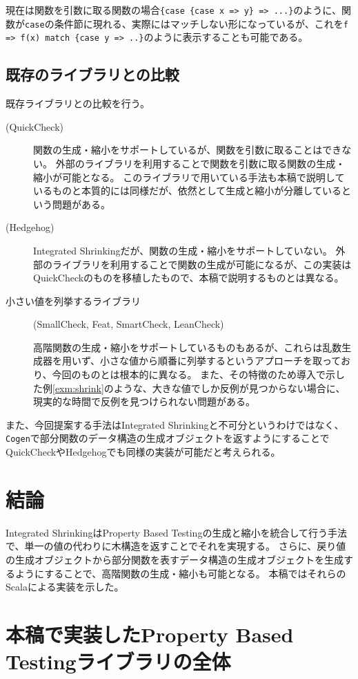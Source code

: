 \documentclass[submit,PRO]{ipsj}
\theoremstyle{definition}
\begin{document}
現在は関数を引数に取る関数の場合\texttt{\{case \{case x => y\} => ...\}}のように、関数が\texttt{case}の条件節に現れる、実際にはマッチしない形になっているが、これを\texttt{f => f(x) match \{case y => ..\}}のように表示することも可能である。

\subsection{既存のライブラリとの比較}

既存ライブラリとの比較を行う。

\begin{description}
  \item[(QuickCheck\cite{claessen_quickcheck_2011})]
    関数の生成・縮小をサポートしているが、関数を引数に取ることはできない。
    外部のライブラリ\cite{quickcheck-higherorder_online}を利用することで関数を引数に取る関数の生成・縮小が可能となる。
    このライブラリで用いている手法も本稿で説明しているものと本質的には同様だが、依然として生成と縮小が分離しているという問題がある。
  \item[(Hedgehog\cite{hedgehog_online})]
    Integrated Shrinkingだが、関数の生成・縮小をサポートしていない。
    外部のライブラリ\cite{hedgehog-fn_online}を利用することで関数の生成が可能になるが、この実装はQuickCheckのものを移植したもので、本稿で説明するものとは異なる。
  \item[小さい値を列挙するライブラリ]
    (SmallCheck\cite{runciman_smallcheck_2008}, Feat\cite{duregaard_feat_2012}, SmartCheck\cite{pike_smartcheck_2014}, LeanCheck\cite{matela_braquehais_tools_2017})

    高階関数の生成・縮小をサポートしているものもあるが、これらは乱数生成器を用いず、小さな値から順番に列挙するというアプローチを取っており、今回のものとは根本的に異なる。
    また、その特徴のため導入で示した例\ref{exm:shrink}のような、大きな値でしか反例が見つからない場合に、現実的な時間で反例を見つけられない問題がある。
\end{description}

また、今回提案する手法はIntegrated Shrinkingと不可分というわけではなく、\texttt{Cogen}で部分関数のデータ構造の生成オブジェクトを返すようにすることでQuickCheckやHedgehogでも同様の実装が可能だと考えられる。

\section{結論}

Integrated ShrinkingはProperty Based Testingの生成と縮小を統合して行う手法で、単一の値の代わりに木構造を返すことでそれを実現する。
さらに、戻り値の生成オブジェクトから部分関数を表すデータ構造の生成オブジェクトを生成するようにすることで、高階関数の生成・縮小も可能となる。
本稿ではそれらのScalaによる実装を示した。




\onecolumn\appendix

\section{本稿で実装したProperty Based Testingライブラリの全体}\label{sec:appndix-1}

\inputminted[autogobble,breaklines,linenos,fontsize=\scriptsize]{scala}{../src/main/scala/minicheck.scala}
\end{document}
